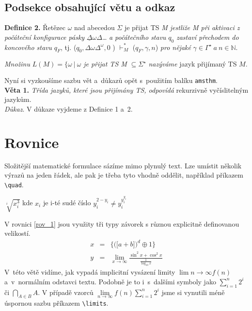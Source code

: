 \documentclass[11pt, titlepage, a4paper, twocolumn]{article}
\begin{document}
\subsection{Podsekce obsahující větu a odkaz}
\textbf{Definice 2.} \label{def_2} 
Řetězec ${\omega}$ nad abecedou ${\Sigma}$ je přijat TS \emph{M jestliže M při aktivaci z počáteční konfigurace pásky} ${\underline{\Delta } \omega \Delta }$\dots \emph{ a počátečního stavu} ${q_0}$ \emph{zastaví přechodem do koncového stavu} ${q_F}$,  tj. (${q_0, \Delta \omega \Delta^ \omega , 0 }$ ) ${\vdash^*_M}$ (${q_F, \gamma , n}$) \emph{pro nějaké} ${\gamma \in \Gamma ^\star \  a \  n \in \mathbb{N}}$. \par
\emph{Množinu} ${L(M) = \{\omega \  | \  \omega}$ \emph{je přijat TS M} ${\subseteq \Sigma^\star }$ \emph{nazýváme} jazyk přijímaný TS $M$.\\ \par
Nyní si vyzkoušíme sazbu vět a~důkazů opět s~použitím balíku \verb|amsthm|.\\[0.4em]
\textbf{Věta 1.} \label{veta_1} \emph{Třída jazyků, které jsou přijímány TS, odpovídá} rekurzivně vyčíslitelným jazykům.\\[0.4em]
\emph{Důkaz}. V důkaze vyjdeme z Definice 1 a~2.

\section{Rovnice}
Složitější matematické formulace sázíme mimo plynulý text. Lze umístit několik výrazů na jeden řádek, ale pak je třeba tyto vhodně oddělit, například příkazem \verb|\quad|.\\ \par
\quad ${\sqrt[i]{x_i^3}}$ kde $x_i$ je i-té sudé číslo ${y_i^{2-y_i} \ne y_i^{y_i^{y_i}}}$
\quad \\[0.4em] \par
V rovnici \ref{rov_1} jsou využity tři typy závorek s různou explicitně definovanou velikostí.
\begin{eqnarray} 
\label{rov_1}
x&=&\bigg\{\Big( \big[ a + b\big] \Big)^d \oplus 1 \bigg\}\\
\label{rov_2}
y&=& \lim_{x \to \infty} \frac{\sin^2x + \cos^2x}{\frac{1}{\log_{10} x}}
\end{eqnarray}
V~této větě vidíme, jak vypadá implicitní vysázení limity $\lim{n \to \infty} f(n)$ a~v~normálním odstavci textu. Podobně je to i~s~dalšími symboly jako $\sum_{i=1}^n 2^i$ či $\bigcap_{A \in B} A $. V případě vzorců $\lim\limits_{n \to \infty} f(n) \sum\limits_{i=1}^n 2^i$ jsme si vynutili méně úspornou sazbu příkazem \verb|\limits|.
\end{document}
